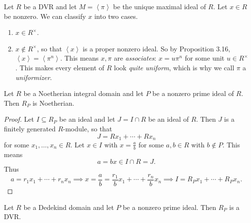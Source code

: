 \documentclass[pmath441]{subfiles}
\begin{document}
    \np Let $R$ be a DVR and let $M = \left< \pi \right>$ be the unique maximal ideal of $R$. Let $x\in R$ be nonzero. We can classify $x$ into two cases.
    \begin{enumerate}
        \item $x\in R^\times$.
        \item $x\notin R^{\times}$, so that $\left< x \right>$ is a proper nonzero ideal. So by Proposition 3.16, $\left< x \right> = \left< \pi^n \right>$. This means $x,\pi$ are \textit{associates}: $x = u\pi^n$ for some unit $u\in R^{\times}$. This makes every element of $R$ look \textit{quite uniform}, which is why we call $\pi$ a \textit{uniformizer}.
    \end{enumerate}
    
    \begin{prop}{}
        Let $R$ be a Noetherian integral domain and let $P$ be a nonzero prime ideal of $R$. Then $R_P$ is Noetherian.
    \end{prop}

    \begin{proof}
        Let $I\subseteq R_P$ be an ideal and let $J = I\cap R$ be an ideal of $R$. Then $J$ is a finitely generated $R$-module, so that
        \begin{equation*}
            J = Rx_1 + \cdots + Rx_n
        \end{equation*}
        for some $x_1,\ldots,x_n\in R$. Let $x\in I$ with $x=\frac{a}{b}$ for some $a,b\in R$ with $b\notin P$. This means
        \begin{equation*}
            a = bx \in I\cap R = J.
        \end{equation*}
        Thus
        \begin{equation*}
            a = r_1x_1 + \cdots + r_nx_n \implies x = \frac{a}{b} = \frac{r_1}{b}x_1 + \cdots + \frac{r_n}{b}x_n \implies I = R_Px_1 + \cdots + R_Px_n.
        \end{equation*}
    \end{proof}
    
    \begin{theorem}{}
        Let $R$ be a Dedekind domain and let $P$ be a nonzero prime ideal. Then $R_P$ is a DVR.
    \end{theorem}
\end{document}
